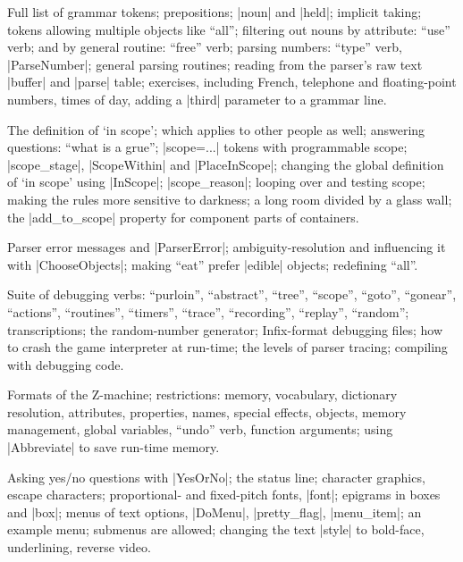 %
Full list of grammar tokens; prepositions; |noun| and |held|; implicit
taking; tokens allowing multiple objects like ``all''; filtering out nouns
by attribute: ``use'' verb; and by general routine: ``free'' verb; parsing
numbers: ``type'' verb, |ParseNumber|; general parsing routines; reading
from the parser's raw text |buffer| and |parse| table; exercises, including
French, telephone and floating-point numbers, times of day, adding a
|third| parameter to a grammar line.

%
The definition of `in scope'; which applies to other people as well;
answering questions: ``what is a grue''; |scope=...| tokens with
programmable scope; |scope_stage|, |ScopeWithin| and |PlaceInScope|;
changing the global definition of `in scope' using |InScope|;
|scope_reason|; looping over and testing scope; making the rules more
sensitive to darkness; a long room divided by a glass wall; the
|add_to_scope| property for component parts of containers.

%
Parser error messages and |ParserError|; ambiguity-resolution and
influencing it with |ChooseObjects|; making ``eat'' prefer |edible|
objects; redefining ``all''.

\vfill\eject
{}

%
Suite of debugging verbs: ``purloin'', ``abstract'', ``tree'', ``scope'',
``goto'', ``gonear'', ``actions'', ``routines'', ``timers'', ``trace'',
``recording'', ``replay'', ``random''; transcriptions; the random-number
generator; Infix-format debugging files; how to crash the game interpreter
at run-time; the levels of parser tracing; compiling with debugging code.

%
Formats of the Z-machine; restrictions: memory, vocabulary, dictionary
resolution, attributes, properties, names, special effects, objects, memory
management, global variables, ``undo'' verb, function arguments; using
|Abbreviate| to save run-time memory.

%
Asking yes/no questions with |YesOrNo|; the status line; character graphics,
escape characters; proportional- and fixed-pitch fonts, |font|; epigrams in
boxes and |box|; menus of text options, |DoMenu|, |pretty_flag|,
|menu_item|; an example menu; submenus are allowed; changing the text
|style| to bold-face, underlining, reverse video.

